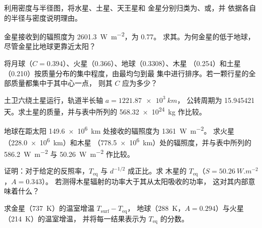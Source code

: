 \begin{exercise}[$\star$]\label{exo:b1:comparative-planetology:2}
利用密度与半径图，将水星、土星、天王星和
金星分别归类为、或，并
依据各自的半径与密度说明理由。
\end{exercise}

\begin{exercise}[$\star$]\label{exo:b1:comparative-planetology:3}
金星接收到的辐照度为 \qty{2601.3}{W.m^{-2}}，为 0.77。
求其。为何金星的低于地球，
尽管金星比地球更靠近太阳？
\end{exercise}

\begin{exercise}[$\star$]\label{exo:b1:comparative-planetology:4}
将月球（$C = 0.394$）、火星（0.366）、地球（0.3308）、木星
（0.254）和土星（0.210）按质量分布的集中程度，由最均匀到最
集中进行排序。若一颗行星的全部质量都集中于其中心一点，
则其 $C$ 应为多少？
\end{exercise}

\begin{exercise}[$\star\star$]\label{exo:b1:comparative-planetology:5}
土卫六绕土星运行，轨道半长轴 $a = \qty{1221.87e3}{km}$，
公转周期为 \num{15.945421} 天。求土星的质量，并与表中所列的
\qty{568.32e24}{kg} 作比较。
\end{exercise}

\begin{exercise}[$\star\star$]\label{exo:b1:comparative-planetology:6}
地球在距太阳 \qty{149.6e6}{km} 处接收的辐照度为 \qty{1361}{W.m^{-2}}。
求火星（\qty{228.0e6}{km}）和木星
（\qty{778.5e6}{km}）处的辐照度，并与表中所列的
\qty{586.2}{W.m^{-2}} 与 \qty{50.26}{W.m^{-2}} 作比较。
\end{exercise}

\begin{exercise}[$\star\star$]\label{exo:b1:comparative-planetology:7}
证明：对于给定的反照率，$T_\mathrm{eq}$ 与 $d^{-1/2}$ 成正比。求
木星的 $T_\mathrm{eq}$（$S = \qty{50.26}{W.m^{-2}}$，$A = 0.343$）。
若测得木星辐射的功率大于其从太阳吸收的功率，
这对其内部意味着什么？
\end{exercise}

\begin{exercise}[$\star\star$]\label{exo:b1:comparative-planetology:8}
求金星（\qty{737}{K}）的温室增温 $T_\mathrm{surf} - T_\mathrm{eq}$，
地球（\qty{288}{K}，$A = 0.294$）与火星（\qty{214}{K}）的温室增温，
并将每一结果表示为 $T_\mathrm{eq}$ 的分数。
\end{exercise}

